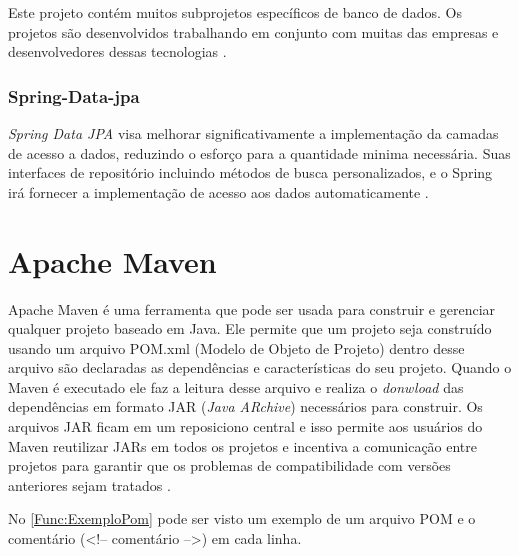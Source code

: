 Este projeto contém muitos subprojetos específicos de banco de dados. Os projetos são desenvolvidos trabalhando em conjunto com muitas das empresas e desenvolvedores dessas tecnologias \cite{springData:2017}.


\subsubsection{Spring-Data-jpa}\label{subsubsec:SpringDatajpa}

\textit{Spring Data JPA} visa melhorar significativamente a implementação da camadas de acesso a dados, reduzindo o esforço para a quantidade minima necessária. Suas interfaces de repositório incluindo métodos de busca personalizados, e o Spring irá fornecer a implementação de acesso aos dados automaticamente \cite{springDataJpa:2017}.



\section{Apache Maven}\label{sec:ApacheMaven}

Apache Maven é uma ferramenta que pode ser usada para construir e gerenciar qualquer projeto baseado em Java. Ele permite que um projeto seja construído usando um arquivo POM.xml (Modelo de Objeto de Projeto) dentro desse arquivo são declaradas as dependências e características do seu projeto. Quando o Maven é executado ele faz a leitura desse arquivo e realiza o \textit{donwload} das dependências em formato JAR (\textit{Java ARchive}) necessários para construir. Os arquivos JAR ficam em um reposiciono central e isso permite aos usuários do Maven reutilizar JARs em todos os projetos e incentiva a comunicação entre projetos para garantir que os problemas de compatibilidade com versões anteriores sejam tratados \cite{ApacheFeature:2017}.


No \autoref{Func:ExemploPom} pode ser visto um exemplo de um arquivo POM e o comentário (<!-- comentário -->) em cada linha.

